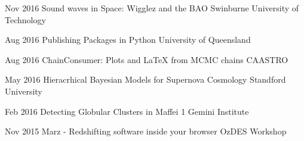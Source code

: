 \begin{entrylist}
	\entryInlineSmall
	{Nov 2016}
	{Sound waves in Space: Wigglez and the BAO}
	{Swinburne University of Technology}
	{}
\end{entrylist}
\begin{entrylist}
	\entryInlineSmall
	{Aug 2016}
	{Publishing Packages in Python}
	{University of Queensland}
	{}
\end{entrylist}
\begin{entrylist}
	\entryInlineSmall
	{Aug 2016}
	{ChainConsumer: Plots and LaTeX from MCMC chains}
	{CAASTRO}
	{}
\end{entrylist}
\begin{entrylist}
	\entryInlineSmall
	{May 2016}
	{Hieracrhical Bayesian Models for Supernova Cosmology}
	{Standford University}
	{}
\end{entrylist}
\begin{entrylist}
	\entryInlineSmall
	{Feb 2016}
	{Detecting Globular Clusters in Maffei 1}
	{Gemini Institute}
	{}
\end{entrylist}
\begin{entrylist}
	\entryInlineSmall
	{Nov 2015}
	{Marz - Redshifting software inside your browser}
	{OzDES Workshop}
	{}
\end{entrylist}

\newpage

